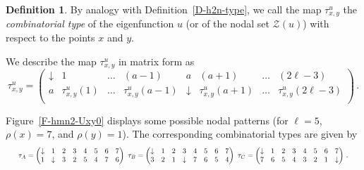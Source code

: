 \documentclass[12pt,a4paper]{amsart}
\theoremstyle{plain} %
\theoremstyle{definition}
\newtheorem{definition}[theorem]{Definition}
\numberwithin{equation}{section}
\numberwithin{figure}{section}
\numberwithin{table}{section}
\newcommand{\cZ}{\mathcal{Z}}
\begin{document}
{\begin{definition}\label{D-hmn-nt}
By analogy with Definition~\ref{D-h2n-type}, we call the map $\tau^{u}_{x,y}$ the \emph{combinatorial type} of the eigenfunction $u$ (or of the nodal set $\cZ(u)$) with respect to the points $x$ and $y$.
\end{definition}%

We describe the map $\tau^{u}_{x,y}$ in matrix form as
%
\begin{equation}\label{E-hmn-21b2}
\tau_{x,y}^{u} = \begin{pmatrix}
                   \downarrow & 1 & \ldots & (a-1) & a & (a+1) & \ldots & (2\ell -3) \\
                   a & \tau_{x,y}^{u}(1) & \ldots & \tau_{x,y}^{u}(a-1) & \downarrow & \tau_{x,y}^{u}(a+1) & \ldots & \tau_{x,y}^{u}(2\ell - 3) \\
                 \end{pmatrix}\,.
\end{equation}
%
\smallskip


Figure~\ref{F-hmn2-Uxy0} displays some possible nodal patterns (for $\ell = 5$, $\rho(x)=7$, and $\rho(y) =1$).  The corresponding combinatorial types are given by
%
\begin{equation*}
\resizebox{.97 \textwidth}{!}
{$
\tau_A = \begin{pmatrix}
           \downarrow & 1 & 2 & 3 & 4 & 5 & 6 & 7 \\
           1 & \downarrow & 3 & 2 & 5 & 4 & 7 & 6 \\
               \end{pmatrix}~
\tau_B = \begin{pmatrix}
           \downarrow & 1 & 2 & 3 & 4 & 5 & 6 & 7 \\
           3 & 2 & 1 & \downarrow & 7 & 6 & 5 & 4 \\
               \end{pmatrix}~
\tau_C = \begin{pmatrix}
           \downarrow & 1 & 2 & 3 & 4 & 5 & 6 & 7 \\
           7 & 6 & 5 & 4 & 3 & 2 & 1 & \downarrow \\
              \end{pmatrix}\,.
$}
\end{equation*}


}
\end{document}
